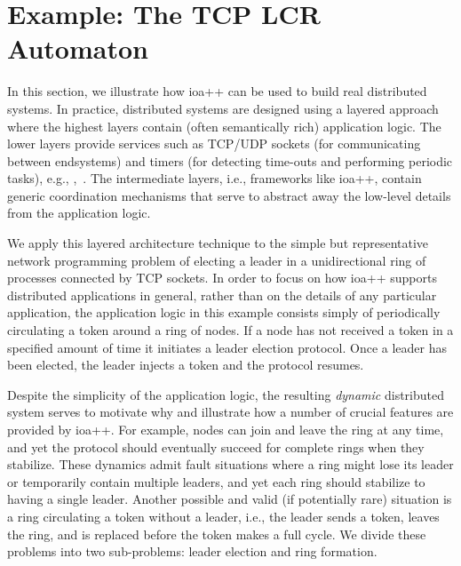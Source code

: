 \section{Example:  The TCP LCR Automaton\label{case_study}}

In this section, we illustrate how ioa++ can be used to build real distributed systems.
In practice, distributed systems are designed using a layered approach where the highest layers contain (often semantically rich) application logic.
The lower layers provide services such as TCP/UDP sockets (for communicating between endsystems) and timers (for detecting time-outs and performing periodic tasks), e.g., \cite{schmidt2001c++},~\cite{schmidt2002c++}.
The intermediate layers, i.e., frameworks like ioa++, contain generic coordination mechanisms that serve to abstract away the low-level details from the application logic.

We apply this layered architecture technique to the simple but representative network programming problem of electing a leader in a unidirectional ring of processes connected by TCP sockets.  
In order to focus on how ioa++ supports distributed applications in general, rather than on the details of any
particular application, the application logic in this example consists simply of periodically circulating a token around a ring of nodes.
If a node has not received a token in a specified amount of time it initiates a leader election protocol.
Once a leader has been elected, the leader injects a token and the protocol resumes.

Despite the simplicity of the application logic, the resulting \emph{dynamic} distributed system serves to motivate why and illustrate how a number of crucial features are provided by ioa++.
For example, nodes can join and leave the ring at any time, and yet the protocol should eventually succeed for complete rings when they stabilize.
These dynamics admit fault situations where a ring might lose its leader or temporarily contain multiple leaders, and yet each ring should stabilize to having a single leader.
Another possible and valid (if potentially rare) situation is a ring circulating a token without a leader, i.e., the leader sends a token, leaves the ring, and is replaced before the token makes a full cycle.
We divide these problems into two sub-problems:  leader election and ring formation.

